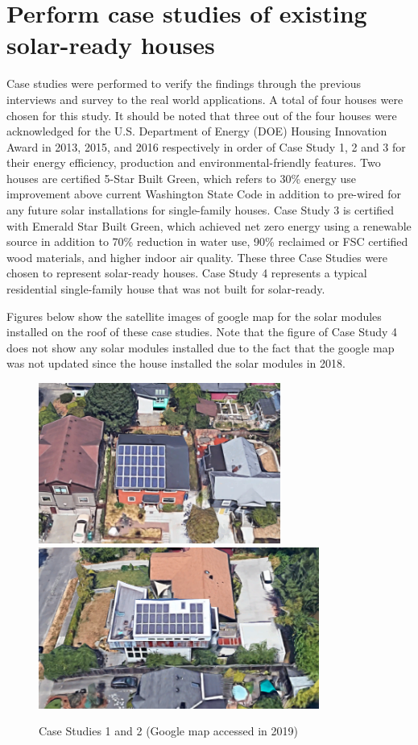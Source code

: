 \documentclass[]{article}
\begin{document}
\hypertarget{perform-case-studies-of-existing-solar-ready-houses}{%
\section{Perform case studies of existing solar-ready
houses}\label{perform-case-studies-of-existing-solar-ready-houses}}

Case studies were performed to verify the findings through the previous
interviews and survey to the real world applications. A total of four
houses were chosen for this study. It should be noted that three out of
the four houses were acknowledged for the U.S. Department of Energy
(DOE) Housing Innovation Award in 2013, 2015, and 2016 respectively in
order of Case Study 1, 2 and 3 for their energy efficiency, production
and environmental-friendly features. Two houses are certified 5-Star
Built Green, which refers to 30\% energy use improvement above current
Washington State Code in addition to pre-wired for any future solar
installations for single-family houses. Case Study 3 is certified with
Emerald Star Built Green, which achieved net zero energy using a
renewable source in addition to 70\% reduction in water use, 90\%
reclaimed or FSC certified wood materials, and higher indoor air
quality. These three Case Studies were chosen to represent solar-ready
houses. Case Study 4 represents a typical residential single-family
house that was not built for solar-ready.

Figures below show the satellite images of google map for the solar
modules installed on the roof of these case studies. Note that the
figure of Case Study 4 does not show any solar modules installed due to
the fact that the google map was not updated since the house installed
the solar modules in 2018.

\begin{figure}
\includegraphics[width=3.12in]{../case/case1/google} \includegraphics[width=3.63in]{../case/case2/google} \caption{Case Studies 1 and 2 (Google map accessed in 2019)}\label{fig:unnamed-chunk-3}
\end{figure}
\end{document}
